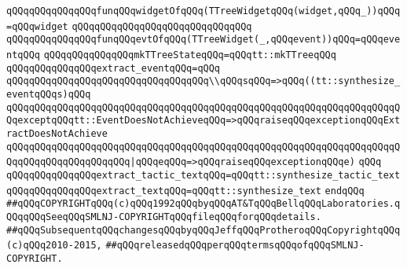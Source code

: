 \newline
\verb|qQQqqQQqqQQqqQQqfunqQQqwidgetOfqQQq(TTreeWidgetqQQq(widget,qQQq_))qQQq=qQQqwidget|\newline
\verb|qQQqqQQqqQQqqQQqqQQqqQQqqQQqqQQq|\newline
\verb|qQQqqQQqqQQqqQQqfunqQQqevtOfqQQq(TTreeWidget(_,qQQqevent))qQQq=qQQqeventqQQq|\newline
\newline
\verb|qQQqqQQqqQQqqQQqmkTTreeStateqQQq=qQQqtt::mkTTreeqQQq|\newline
\newline
\verb|qQQqqQQqqQQqqQQqextract_eventqQQq=qQQq|\newline
\verb|qQQqqQQqqQQqqQQqqQQqqQQqqQQqqQQqqQQq\\qQQqsqQQq=>qQQq((tt::synthesize_eventqQQqs)qQQq|\newline
\verb|qQQqqQQqqQQqqQQqqQQqqQQqqQQqqQQqqQQqqQQqqQQqqQQqqQQqqQQqqQQqqQQqqQQqqQQqexceptqQQqtt::EventDoesNotAchieveqQQq=>qQQqraiseqQQqexceptionqQQqExtractDoesNotAchieve|\newline
\verb|qQQqqQQqqQQqqQQqqQQqqQQqqQQqqQQqqQQqqQQqqQQqqQQqqQQqqQQqqQQqqQQqqQQqqQQqqQQqqQQqqQQqqQQqqQQq|\verb#|qQQqeqQQq=>qQQqraiseqQQqexceptionqQQqe)#\newline
\verb|qQQq|\newline
\verb|qQQqqQQqqQQqqQQqextract_tactic_textqQQq=qQQqtt::synthesize_tactic_text|\newline
\newline
\verb|qQQqqQQqqQQqqQQqextract_textqQQq=qQQqtt::synthesize_text|\newline
\newline
\verb|endqQQq|\newline
\newline
\newline
\verb|##qQQqCOPYRIGHTqQQq(c)qQQq1992qQQqbyqQQqAT&TqQQqBellqQQqLaboratories.qQQqqQQqSeeqQQqSMLNJ-COPYRIGHTqQQqfileqQQqforqQQqdetails.|\newline
\verb|##qQQqSubsequentqQQqchangesqQQqbyqQQqJeffqQQqProtheroqQQqCopyrightqQQq(c)qQQq2010-2015,|\newline
\verb|##qQQqreleasedqQQqperqQQqtermsqQQqofqQQqSMLNJ-COPYRIGHT.|\newline

